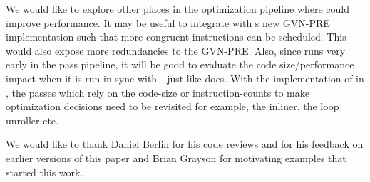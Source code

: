 \documentclass[sigplan,10pt,review,anonymous]{acmart}\settopmatter{printfolios=true,printccs=false,printacmref=false}
\begin{document}
We would like to explore other places in the optimization pipeline where \GCM{}
could improve performance. It may be useful to integrate \GCM{} with s
new GVN-PRE implementation such that more congruent instructions can be
scheduled. This would also expose more redundancies to the GVN-PRE. Also, since
\GCM{} runs very early in the pass pipeline, it will be good to evaluate the
code size/performance impact when it is run in sync with \GVN{}-\PRE{} just like
\GCC{} does. With the implementation of \GCM{} in \LLVM{}, the passes which rely
on the code-size or instruction-counts to make optimization decisions need to be
revisited for example, the inliner, the loop unroller etc.


\begin{acks}                            %
We would like to thank Daniel Berlin for his code reviews and for his feedback
on earlier versions of this paper and Brian Grayson for motivating examples that
started this work.
\end{acks}


%


\end{document}
